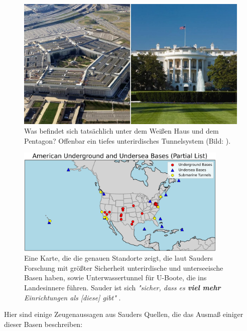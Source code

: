 \documentclass[10pt,twocolumn,letterpaper]{article}
\begin{document}
\begin{figure}[b]
\begin{center}
   \includegraphics[width=1\linewidth]{penta.jpg}
\end{center}
   \caption{Was befindet sich tatsächlich unter dem Weißen Haus und dem Pentagon? Offenbar ein tiefes unterirdisches Tunnelsystem (Bild: \cite{31}).}
\label{fig:3}
\label{fig:onecol}
\end{figure}
\begin{figure}[t]
\begin{center}
\includegraphics[width=0.9\textwidth]{basescrop.png}
\end{center}
   \caption{Eine Karte, die die genauen Standorte zeigt, die laut Sauders Forschung mit größter Sicherheit unterirdische und unterseeische Basen haben, sowie Unterwassertunnel für U-Boote, die ins Landesinnere führen. Sauder ist sich \textit{"sicher, dass es \textbf{viel mehr} Einrichtungen als [diese] gibt"} \cite{22}.}
   \label{fig:4}
\end{figure}

Hier sind einige Zeugenaussagen aus Sauders Quellen, die das Ausmaß einiger dieser Basen beschreiben:
\end{document}
